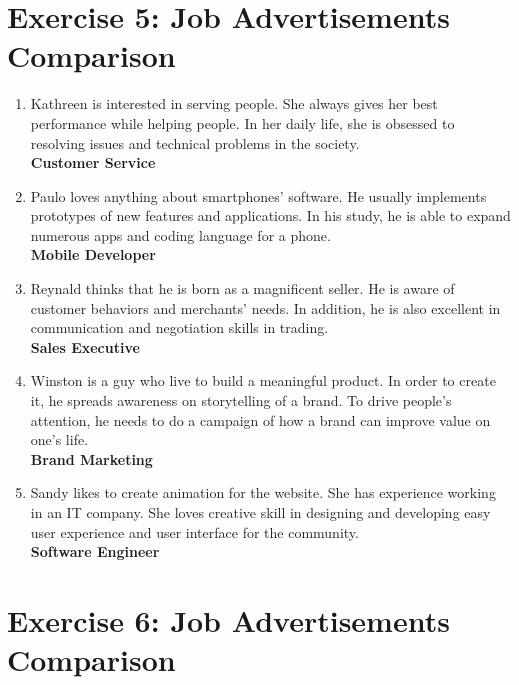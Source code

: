 \documentclass[12pt,titlepage]{article}
\begin{document}
\pagebreak

\section{Exercise 5: Job Advertisements Comparison}

\begin{enumerate}
    \item {
        Kathreen is interested in serving people. She always gives her best
        performance while helping people. In her daily life, she is obsessed
        to resolving issues and technical problems in the society.\\
        \textbf{Customer Service}
    } 
    \item {
        Paulo loves anything about smartphones’ software. He usually
        implements prototypes of new features and applications. In his
        study, he is able to expand numerous apps and coding language
        for a phone.\\
        \textbf{Mobile Developer}
    } 
    \item {
        Reynald thinks that he is born as a magnificent seller. He is aware of
        customer behaviors and merchants’ needs. In addition, he is also
        excellent in communication and negotiation skills in trading.\\
        \textbf{Sales Executive}
    }
    \item {
        Winston is a guy who live to build a meaningful product. In order
        to create it, he spreads awareness on storytelling of a brand. To
        drive people’s attention, he needs to do a campaign of how a
        brand can improve value on one’s life.\\
        \textbf{Brand Marketing}
    }
    \item {
        Sandy likes to create animation for the website. She has experience
        working in an IT company. She loves creative skill in designing and
        developing easy user experience and user interface for the
        community.\\
        \textbf{Software Engineer}
    }
\end{enumerate}

\pagebreak

\section{Exercise 6: Job Advertisements Comparison}
\end{document}
